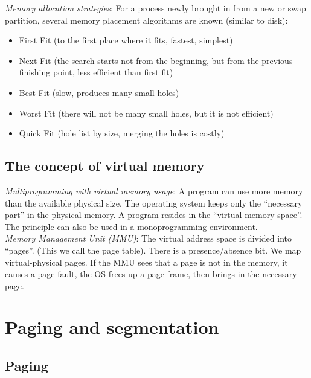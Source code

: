 \documentclass[margin=0px]{article}
\begin{document}
\textit{Memory allocation strategies}: For a process newly brought in from a new or swap partition, several memory placement algorithms are known (similar to disk):
\begin{itemize}
    \item First Fit (to the first place where it fits, fastest, simplest)
    \item Next Fit (the search starts not from the beginning, but from the previous finishing point, less efficient than first fit)
    \item Best Fit (slow, produces many small holes)
    \item Worst Fit (there will not be many small holes, but it is not efficient)
    \item Quick Fit (hole list by size, merging the holes is costly)
\end{itemize}

\subsection{The concept of virtual memory}

\textit{Multiprogramming with virtual memory usage}: A program can use more memory than the available physical size. The operating system keeps only the ``necessary part'' in the physical memory. A program resides in the ``virtual memory space''. The principle can also be used in a monoprogramming environment. \\
\textit{Memory Management Unit (MMU)}: The virtual address space is divided into ``pages''. (This we call the page table). There is a presence/absence bit. We map virtual-physical pages. If the MMU sees that a page is not in the memory, it causes a page fault, the OS frees up a page frame, then brings in the necessary page.

\section{Paging and segmentation}

\subsection{Paging}
\end{document}
